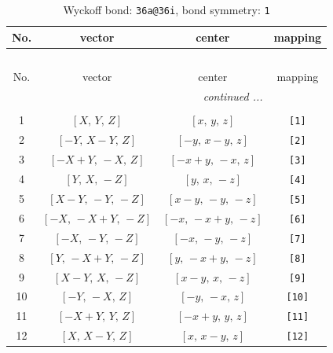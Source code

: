 \documentclass[fleqn,8pt]{jsarticle}
\begin{document}
\begin{longtable}{cccc}
\caption{Wyckoff bond: {\tt 36a@36i}, bond symmetry: {\tt 1}}
 \\
 \hline \hline
No. & vector & center & mapping \\ \hline \endfirsthead

\multicolumn{3}{l}{\tablename\ \thetable{}} \\
 \hline \hline
No. & vector & center & mapping \\ \hline \endhead

 \hline \hline
\multicolumn{3}{r}{\footnotesize\it continued ...} \\ \endfoot

 \hline \hline
\multicolumn{3}{r}{} \\ \endlastfoot

1 & $\left[ X,\, Y,\, Z \right]$ & $\left[ x,\, y,\, z \right]$ & {\tt [1]} \\ \hline
2 & $\left[ - Y,\, X - Y,\, Z \right]$ & $\left[ - y,\, x - y,\, z \right]$ & {\tt [2]} \\ \hline
3 & $\left[ - X + Y,\, - X,\, Z \right]$ & $\left[ - x + y,\, - x,\, z \right]$ & {\tt [3]} \\ \hline
4 & $\left[ Y,\, X,\, - Z \right]$ & $\left[ y,\, x,\, - z \right]$ & {\tt [4]} \\ \hline
5 & $\left[ X - Y,\, - Y,\, - Z \right]$ & $\left[ x - y,\, - y,\, - z \right]$ & {\tt [5]} \\ \hline
6 & $\left[ - X,\, - X + Y,\, - Z \right]$ & $\left[ - x,\, - x + y,\, - z \right]$ & {\tt [6]} \\ \hline
7 & $\left[ - X,\, - Y,\, - Z \right]$ & $\left[ - x,\, - y,\, - z \right]$ & {\tt [7]} \\ \hline
8 & $\left[ Y,\, - X + Y,\, - Z \right]$ & $\left[ y,\, - x + y,\, - z \right]$ & {\tt [8]} \\ \hline
9 & $\left[ X - Y,\, X,\, - Z \right]$ & $\left[ x - y,\, x,\, - z \right]$ & {\tt [9]} \\ \hline
10 & $\left[ - Y,\, - X,\, Z \right]$ & $\left[ - y,\, - x,\, z \right]$ & {\tt [10]} \\ \hline
11 & $\left[ - X + Y,\, Y,\, Z \right]$ & $\left[ - x + y,\, y,\, z \right]$ & {\tt [11]} \\ \hline
12 & $\left[ X,\, X - Y,\, Z \right]$ & $\left[ x,\, x - y,\, z \right]$ & {\tt [12]} \\
\end{longtable}
\end{document}
